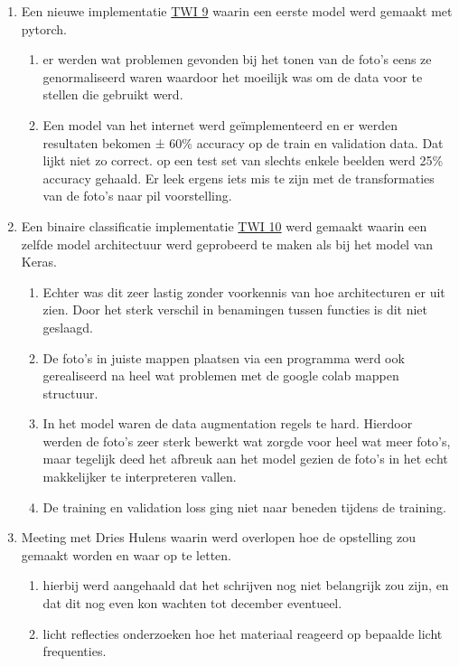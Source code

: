\documentclass{article}
\begin{document}
\begin{enumerate}[1]
\item Een nieuwe implementatie \href{https://colab.research.google.com/drive/1f-Rfei8QrHotvgktp8hzviR8dv1XJJjz}{TWI 9} waarin een eerste model werd gemaakt met pytorch. 
	\begin{enumerate}[a]
	\item er werden wat problemen gevonden bij het tonen van de foto's eens ze genormaliseerd waren waardoor het moeilijk was om de data voor te stellen die gebruikt werd. 
	\item Een model van het internet werd geïmplementeerd en er werden resultaten bekomen ± 60\% accuracy op de train en validation data. Dat lijkt niet zo correct. op een test set van slechts enkele beelden werd 25\% accuracy gehaald. Er leek ergens iets mis te zijn met de transformaties van de foto's naar pil voorstelling. 
	\end{enumerate}
\item Een binaire classificatie implementatie \href{https://colab.research.google.com/drive/1t4Yvzj1rqNy24pj4dDtyBH2CStDePXMw}{TWI 10} werd gemaakt waarin een zelfde model architectuur werd geprobeerd te maken als bij het model van Keras. 
	\begin{enumerate}[a]
	\item Echter was dit zeer lastig zonder voorkennis van hoe architecturen er uit zien. Door het sterk verschil in benamingen tussen functies is dit niet geslaagd. 
	\item De foto's in juiste mappen plaatsen via een programma werd ook gerealiseerd na heel wat problemen met de google colab mappen structuur. 
	\item In het model waren de data augmentation regels te hard. Hierdoor werden de foto's zeer sterk bewerkt wat zorgde voor heel wat meer foto's, maar tegelijk deed het afbreuk aan het model gezien de foto's in het echt makkelijker te interpreteren vallen. 
	\item De training en validation loss ging niet naar beneden tijdens de training.
	\end{enumerate}
\item Meeting met Dries Hulens waarin werd overlopen hoe de opstelling zou gemaakt worden en waar op te letten.
	\begin{enumerate}[a]
	\item hierbij werd aangehaald dat het schrijven nog niet belangrijk zou zijn, en dat dit nog even kon wachten tot december eventueel.
	\item licht reflecties onderzoeken hoe het materiaal reageerd op bepaalde licht frequenties.

\end{enumerate}
\end{enumerate}
\end{document}
